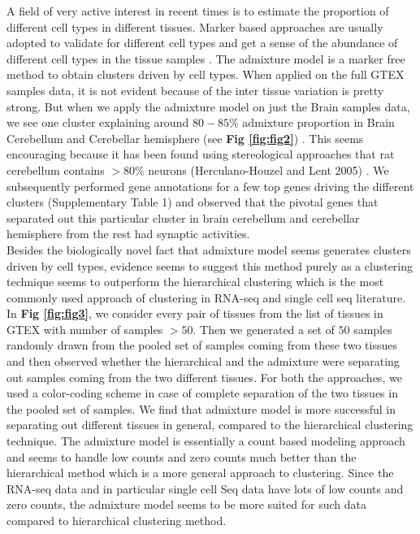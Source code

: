 A field of very active interest in recent times is to estimate the proportion of different cell types in different tissues. Marker based approaches are usually adopted to validate for different cell types and get a sense of the abundance of different cell types in the tissue samples \cite{Grun2015} \cite{Palmer2005}. The admixture model is a marker free method to obtain clusters driven by cell types. When applied on the full GTEX samples data, it is not evident because of the inter tissue variation is pretty strong. But when we apply the admixture model on just the Brain samples data, we see one cluster explaining around $80-85 \%$ admixture proportion in Brain Cerebellum and Cerebellar hemisphere (see \textbf{Fig \ref{fig:fig2}}) . This seems encouraging because it has been found using stereological approaches that rat cerebellum contains $> 80 \%$ neurons (Herculano-Houzel and Lent 2005) \cite{Houzel2005}. We subsequently performed gene annotations for a few top genes driving the different clusters (Supplementary Table 1) and observed that the pivotal genes that separated out this particular cluster in brain cerebellum and cerebellar hemisphere from the rest had synaptic activities. \\[3 pt]

Besides the biologically novel fact that admixture model seems generates clusters driven by cell types, evidence seems to suggest this method purely as a clustering technique seems to outperform the hierarchical clustering which is the most commonly used approach of clustering in RNA-seq and single cell seq literature. In \textbf{Fig \ref{fig:fig3}}, we consider every pair of tissues from the list of tissues in GTEX with number of samples $> 50$. Then we generated a set of $50$ samples randomly drawn from the pooled set of samples coming from these two tissues and then observed whether the hierarchical and the admixture were separating out samples coming from the two different tissues. For both the approaches, we used a color-coding scheme in case of complete separation of the two tissues in the pooled set of samples. We find that admixture model is more successful in separating out different tissues in general, compared to the hierarchical clustering technique. The admixture model is essentially a count based modeling approach and seems to handle low counts and zero counts much better than the hierarchical method which is a more general approach to clustering. Since the RNA-seq data and in particular single cell Seq data have lots of low counts and zero counts, the admixture model seems to be more suited for such data compared to hierarchical clustering method. \\[3 pt]

